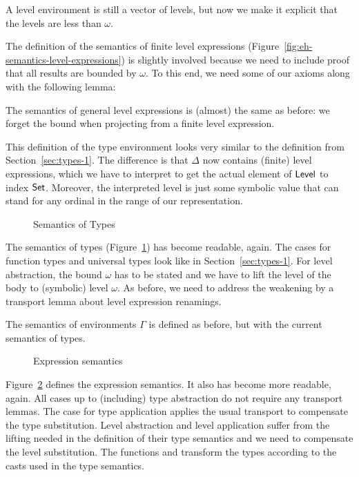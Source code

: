 \documentclass[manuscript,screen,review,anonymous]{acmart}
\begin{document}
A level environment is still a vector of levels, but now we make it
explicit that the levels are less than $\omega$.

\EHLEnvSem

The definition of the semantics of finite level expressions (Figure~\ref{fig:eh-semantics-level-expressions}) is
slightly involved because we need to include proof that all results
are bounded by $\omega$. To this end, we need some of our axioms along
with the following lemma:
\EHzeroLtomega

The semantics of general level expressions is (almost) the same as
before: we forget the bound when projecting from a finite level
expression. 

\EHFTSEAsFunction

This definition of the type environment looks very similar to the
definition from Section~\ref{sec:types-1}. The difference is that
$\Delta$ now contains (finite) level expressions, which we have to
interpret to get the actual element of $\ALevel$ to index
$\ASet$. Moreover, the interpreted level is just some symbolic value
that can stand for any ordinal in the range of our representation.

\begin{figure}[tp]
  \EHTSem
  \caption{Semantics of Types}
  \label{fig:eh-semantics-types}
\end{figure}
The semantics of types (Figure~\ref{fig:eh-semantics-types}) has
become readable, again. The cases for function types and universal
types look like in Section~\ref{sec:types-1}. For level abstraction,
the bound $\omega$ has to be stated and we have to lift the level of
the body to (symbolic) level $\omega$. As before, we need to address
the weakening by a transport lemma  about level
expression renamings.

The semantics of environments $\Gamma$ is defined as before, but with
the current semantics of types.
\begin{figure}
  \EHESem
  \caption{Expression semantics}
  \label{fig:eh-expression-semantics}
\end{figure}

Figure~\ref{fig:eh-expression-semantics} defines the expression
semantics. It also has become more readable, again. All cases up to
(including) type abstraction do not require any transport lemmas. The
case for type application applies the usual transport to compensate
the type substitution. Level abstraction and level application suffer
from the lifting needed in the definition of their type semantics and
we need to compensate the level substitution. The functions
 and  transform the
types according to the casts used in the type semantics.
\end{document}
